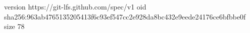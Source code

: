 version https://git-lfs.github.com/spec/v1
oid sha256:963ab4765135205413f6c93ef547cc2e928da8bc432e9eede24176ce6bfbbe0f
size 78
